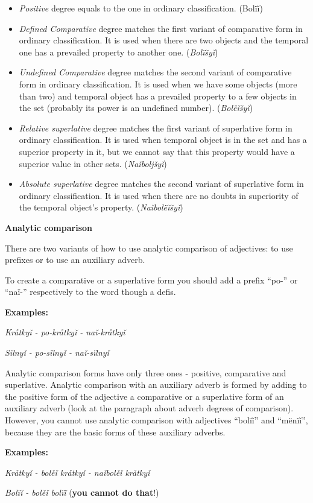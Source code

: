 \begin{itemize}
	\item \textit{Positive} degree equals to the one in ordinary classification. (Bolïǐ)

	\item \textit{Defined Comparative} degree matches the first variant of comparative form in ordinary classification. It is used when there are two objects and the temporal one has a prevailed property to another one. (\textit{Bolïšyǐ})

	\item \textit{Undefined Comparative} degree matches the second variant of comparative form in ordinary classification. It is used when we have some objects (more than two) and temporal object has a prevailed property to a few objects in the set (probably its power is an undefined number). (\textit{Bolëǐšyǐ})

	\item \textit{Relative superlative} degree matches the first variant of superlative form in ordinary classification. It is used when temporal object is in the set and has a superior property in it, but we cannot say that this property would have a superior value in other sets. (\textit{Naǐboljšyǐ})

	\item \textit{Absolute superlative} degree matches the second variant of superlative form in ordinary classification. It is used when there are no doubts in superiority of the temporal object’s property. (\textit{Naǐbolëǐšyǐ})
\end{itemize}

\textbf{Analytic comparison}

There are two variants of how to use analytic comparison of adjectives: to use prefixes or to use an auxiliary adverb.

To create a comparative or a superlative form you should add a prefix “po-” or “naǐ-” respectively to the word though a defis.

\textbf{Examples:}

\textit{Kråtkyǐ - po-kråtkyǐ - naǐ-kråtkyǐ}

\textit{Sïlnyǐ - po-sïlnyǐ - naǐ-sïlnyǐ}

Analytic comparison forms have only three ones - positive, comparative and superlative. Analytic comparison with an auxiliary adverb is formed by adding to the positive form of the adjective a comparative or a superlative form of an auxiliary adverb (look at the paragraph about adverb degrees of comparison). However, you cannot use analytic comparison with adjectives “bolïǐ” and “mënïǐ”, because they are the basic forms of these auxiliary adverbs.

\textbf{Examples:}

\textit{Kråtkyǐ - bolěǐ kråtkyǐ - naǐbolěǐ kråtkyǐ}

\textit{Bolïǐ - bolěǐ bolïǐ} (\textbf{you cannot do that}!)
